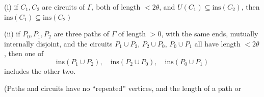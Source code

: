\hspace*{12pt}(i) if $C_1, C_2$ are circuits of $\Gamma$, both of length $< 2\theta$, and $U(C_1) \subseteq \text{ins}(C_2)$, then $\text{ins}(C_1) \subseteq \text{ins}(C_2)$

\hspace*{12pt}(ii) if $P_0, P_1, P_2$ are three paths of $\Gamma$ of length $> 0$, with the same ends, mutually internally disjoint, and the circuits $P_1 \cup P_2$, $P_2 \cup P_0$, $P_0 \cup P_1$ all have length $< 2\theta$, then one of
\begin{equation*}
\text{ins}(P_1 \cup P_2), \quad \text{ins}(P_2 \cup P_0), \quad \text{ins}(P_0 \cup P_1)
\end{equation*}
includes the other two.

(Paths and circuits have no ``repeated'' vertices, and the length of a path or
